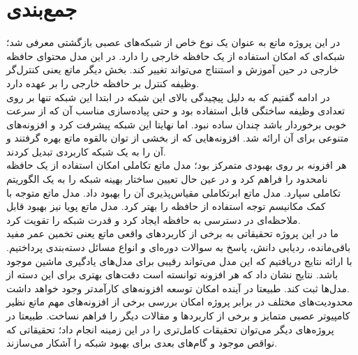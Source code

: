 \chapter{جمع‌بندی}
در این پروژه ماتع به عنوان یک نوع خاص از شبکه‌های عصبی بازگشتی معرفی شد؛ شبکه‌ای که امکان استفاده از یک حافظه خارجی را دارد. در این مدل محتوای حافظه خارجی در حین آموزش و استنتاج می‌تواند تغییر کند. بخش دیگر ماتع یعنی کنترل‌گر وظیفه کنترل بر حافظه خارجی را بر عهده دارد.
\\

در ادامه گفتیم که به دلیل پیچیدگی بالای این شبکه در ابتدا این شبکه تنها بر روی تعدادی وظیفه ساختگی قابل استفاده بود و حتی پیاده‌سازی مناسب آن که از سرعت خوبی برخوردار باشد چندان ساده نبود. اما نهایتا این شبکه پیشرفت کرد و افزونه‌های متنوعی برای آن ارائه شد. افزونه‌هایی که از بخشی از توان بالقوه ماتع بهره گرفتند و آن را به یک شبکه کاربردی تبدیل کردند.
\\

هر افزونه بر روی بهبودی متمرکز بود؛ مدل ماتع تکاملی امکان استفاده از یک حافظه نامحدود را فراهم کرد و در عین حال تعیین ساختار بهینه شبکه را به یک الگوریتم تکاملی سپارد. مدل ماتع ابرتکاملی مقیاس‌پذیری آن را بهبود داد. مدل ماتع متوجه با کمک مکانیسم توجه استفاده از حافظه را بهتر کرد. مدل ماتع پویا نیز بهبود قابل ملاحظه‌ای در دسترسی به حافظه ایجاد کرد و قدرت شبکه را تقویت کرد. 
\\

ما در این پروژه تحقیقاتی به برخی از کاربردهای واقعی ماتع یعنی تخمین عمر مفید باقی‌مانده، ردیابی دانش، پاسخ به سوالات دوره‌ای و انواع مسائل دسته‌بندی پرداختیم. با ارائه نتایج دریافتیم که این مدل می‌تواند رقیبی برای مدل‌های یادگیری ماشین موجود باشد. نتایج نشان داد که هر افزونه توانسته است دقت‌های بهتری برای این دسته از مدل‌ها ثبت کند. طبیعتا در آینده امکان توسعه افزونه‌های کارآمدتر وجود خواهد داشت.
\\

محدودیت‌های مختلف در برابر پروژه امکان بررسی برخی از افزونه‌های مهم ماتع نظیر کامپیوتر عصبی متمایز و برخی از کاربردها و مقالات دیگر را فراهم نساخت. طبیعتا در پروژه‌های دیگر می‌توان تحقیقات کامل‌تری را در این زمینه انجام داد؛ تحقیقاتی که نواقص موجود و گام‌های بعدی برای بهبود شبکه را آشکار می‌سازند.